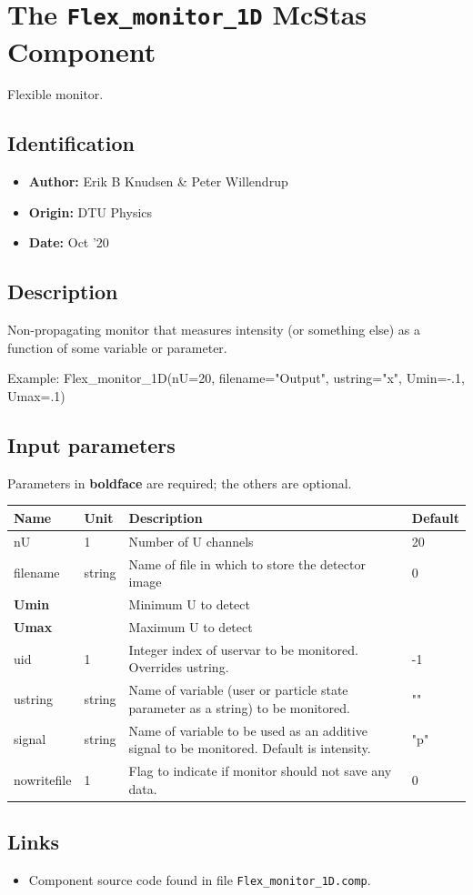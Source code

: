 \section{The \texttt{Flex\_monitor\_1D} McStas Component}
Flexible monitor.

\subsection*{Identification}
\begin{itemize}
  \item \textbf{Author:} Erik B Knudsen \& Peter Willendrup
  \item \textbf{Origin:} DTU Physics
  \item \textbf{Date:} Oct '20
\end{itemize}

\subsection*{Description}
Non-propagating monitor that measures intensity (or something else) as a function of some variable or parameter.

Example: Flex\_monitor\_1D(nU=20, filename="Output", ustring="x", Umin=-.1, Umax=.1)

\subsection*{Input parameters}
Parameters in \textbf{boldface} are required; the others are optional.

\begin{longtable}{p{}p{}p{}p{}}
\toprule
\textbf{Name} & \textbf{Unit} & \textbf{Description} & \textbf{Default} \\
\midrule
\endhead
nU & 1 & Number of U channels & 20 \\
filename & string & Name of file in which to store the detector image & 0 \\
\textbf{Umin} &  & Minimum U to detect &  \\
\textbf{Umax} &  & Maximum U to detect &  \\
uid & 1 & Integer index of uservar to be monitored. Overrides ustring. & -1 \\
ustring & string & Name of variable (user or particle state parameter as a string) to be monitored. & "" \\
signal & string & Name of variable to be used as an additive signal to be monitored. Default is intensity. & "p" \\
nowritefile & 1 & Flag to indicate if monitor should not save any data. & 0 \\
\bottomrule
\end{longtable}

\subsection*{Links}
\begin{itemize}
  \item Component source code found in file \texttt{Flex\_monitor\_1D.comp}.
\end{itemize}
